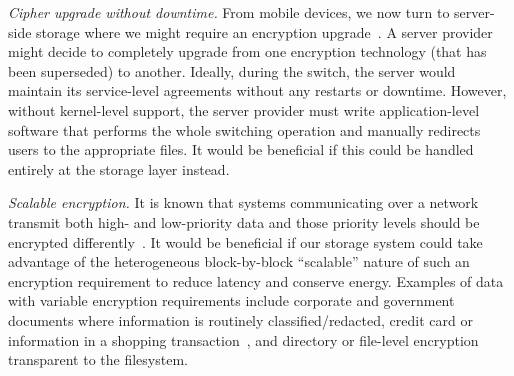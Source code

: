 {\em Cipher upgrade without downtime.} From mobile devices, we now turn to
server-side storage where we might require an encryption
upgrade~\cite{upgrade-encryption1,upgrade-encryption2,upgrade-encryption3}. A
server provider might decide to completely upgrade from one encryption
technology (\eg that has been superseded) to another. Ideally, during the
switch, the server would maintain its service-level agreements without any
restarts or downtime. However, without kernel-level support, the server provider
must write application-level software that performs the whole switching
operation and manually redirects users to the appropriate files. It would be
beneficial if this could be handled entirely at the storage layer instead.

{\em Scalable encryption.} It is known that systems communicating over a network
transmit both high- and low-priority data and those priority levels  should be encrypted
differently~\cite{ScalableSecurity}. It would be beneficial if our storage system could take
advantage of the heterogeneous block-by-block ``scalable'' nature of such an
encryption requirement to reduce latency and conserve energy. Examples of data
with variable encryption requirements include corporate and government documents
where information is routinely classified/redacted, credit card or information
in a shopping transaction~\cite{ScalableSecurity}, and directory or file-level
encryption transparent to the filesystem.
